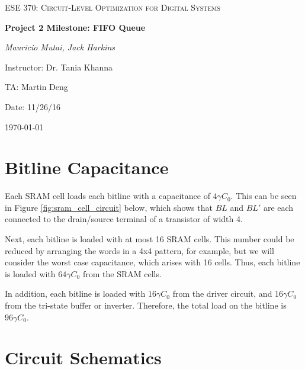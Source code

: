 \documentclass[12pt]{report}
\begin{document}
\begin{titlepage}
	\centering
	\vspace{1cm}
	{\scshape\Large ESE 370: Circuit-Level Optimization for Digital Systems\par}
	\vspace{1.5cm}
	{\huge\bfseries Project 2 Milestone: FIFO Queue\par}
	\vspace{2cm}
	{\Large\itshape Mauricio Mutai, Jack Harkins\par}
	\vfill
	Instructor: Dr. Tania Khanna\par
	TA: Martin Deng\par
	Date: 11/26/16

	\vfill

	{\large \today\par}
\end{titlepage}

\section*{Bitline Capacitance}
Each SRAM cell loads each bitline with a capacitance of $4\gamma C_0$. This can be seen in Figure \ref{fig:sram_cell_circuit} below, which shows that $BL$ and $BL'$ are each connected to the drain/source terminal of a transistor of width 4.

Next, each bitline is loaded with at most 16 SRAM cells. This number could be reduced by arranging the words in a 4x4 pattern, for example, but we will consider the worst case capacitance, which arises with 16 cells. Thus, each bitline is loaded with $64\gamma C_0$ from the SRAM cells.

In addition, each bitline is loaded with $16\gamma C_0$ from the driver circuit, and $16\gamma C_0$ from the tri-state buffer or inverter. Therefore, the total load on the bitline is $96\gamma C_0$.

\section*{Circuit Schematics}
\end{document}
